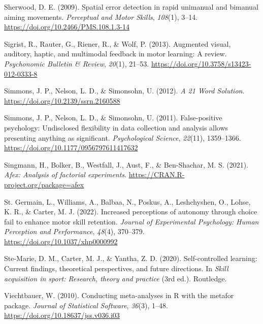 \documentclass[
  man, donotrepeattitle,floatsintext]{apa7}
\newlength{\cslhangindent}
\newlength{\cslentryspacingunit} %
\newenvironment{CSLReferences}[2] %
 {%
  \setlength{\parindent}{0pt}
  \ifodd #1
  \let\oldpar\par
  \def\par{\hangindent=\cslhangindent\oldpar}
  \fi
  \setlength{\parskip}{#2\cslentryspacingunit}
 }%
 {}
\begin{document}
\begin{CSLReferences}{1}{0}
\leavevmode{}%
Sherwood, D. E. (2009). Spatial error detection in rapid unimanual and bimanual aiming movements. \emph{Perceptual and Motor Skills}, \emph{108}(1), 3--14. \url{https://doi.org/10.2466/PMS.108.1.3-14}

\leavevmode{}%
Sigrist, R., Rauter, G., Riener, R., \& Wolf, P. (2013). Augmented visual, auditory, haptic, and multimodal feedback in motor learning: A review. \emph{Psychonomic Bulletin \& Review}, \emph{20}(1), 21--53. \url{https://doi.org/10.3758/s13423-012-0333-8}

\leavevmode{}%
Simmons, J. P., Nelson, L. D., \& Simonsohn, U. (2012). \emph{A 21 Word Solution}. \url{https://doi.org/10.2139/ssrn.2160588}

\leavevmode{}%
Simmons, J. P., Nelson, L. D., \& Simonsohn, U. (2011). False-positive psychology: Undisclosed flexibility in data collection and analysis allows presenting anything as significant. \emph{Psychological Science}, \emph{22}(11), 1359--1366. \url{https://doi.org/10.1177/0956797611417632}

\leavevmode{}%
Singmann, H., Bolker, B., Westfall, J., Aust, F., \& Ben-Shachar, M. S. (2021). \emph{Afex: Analysis of factorial experiments}. \url{https://CRAN.R-project.org/package=afex}

\leavevmode{}%
St. Germain, L., Williams, A., Balbaa, N., Poskus, A., Leshchyshen, O., Lohse, K. R., \& Carter, M. J. (2022). Increased perceptions of autonomy through choice fail to enhance motor skill retention. \emph{Journal of Experimental Psychology: Human Perception and Performance}, \emph{48}(4), 370--379. \url{https://doi.org/10.1037/xhp0000992}

\leavevmode{}%
Ste-Marie, D. M., Carter, M. J., \& Yantha, Z. D. (2020). Self-controlled learning: {Current} findings, theoretical perspectives, and future directions. In \emph{Skill acquisition in sport: Research, theory and practice} (3rd ed.). {Routledge}.

\leavevmode{}%
Viechtbauer, W. (2010). Conducting meta-analyses in {R} with the {metafor} package. \emph{Journal of Statistical Software}, \emph{36}(3), 1--48. \url{https://doi.org/10.18637/jss.v036.i03}


\end{CSLReferences}
\end{document}

